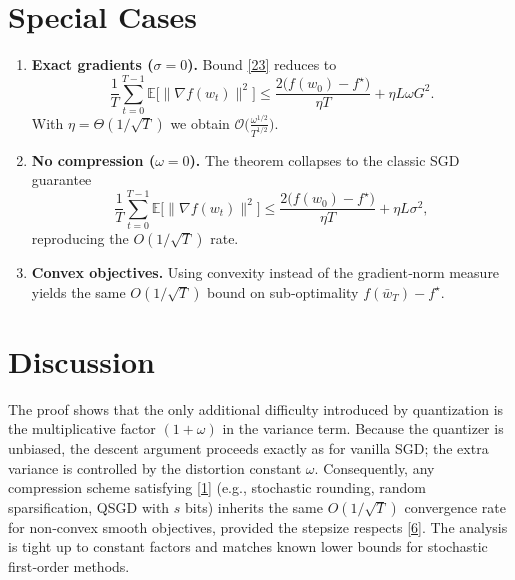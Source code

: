 \documentclass{article}
\begin{document}
\section*{Special Cases}
\begin{enumerate}[label=\arabic*)]
\item \textbf{Exact gradients ($\sigma=0$).}  
   Bound \eqref{23} reduces to
   \[
   \frac{1}{T}\sum_{t=0}^{T-1}\mathbb{E}\big[\|\nabla f(w_{t})\|^{2}\big]
   \le
   \frac{2\big(f(w_{0})-f^{\star}\big)}{\eta T}
   +\eta L\omega G^{2}.
   \]
   With $\eta=\Theta(1/\sqrt{T})$ we obtain $\mathcal{O}\big(\frac{\omega^{1/2}}{T^{1/2}}\big)$.

\item \textbf{No compression ($\omega=0$).}  
   The theorem collapses to the classic SGD guarantee
   \[
   \frac{1}{T}\sum_{t=0}^{T-1}\mathbb{E}\big[\|\nabla f(w_{t})\|^{2}\big]
   \le
   \frac{2\big(f(w_{0})-f^{\star}\big)}{\eta T}
   +\eta L\sigma^{2},
   \]
   reproducing the $O(1/\sqrt{T})$ rate.

\item \textbf{Convex objectives.}  
   Using convexity instead of the gradient‑norm measure yields the same $O(1/\sqrt{T})$ bound on sub‑optimality $f(\bar w_{T})-f^{\star}$.

\end{enumerate}

\section*{Discussion}
The proof shows that the only additional difficulty introduced by quantization is the multiplicative factor $(1+\omega)$ in the variance term. Because the quantizer is unbiased, the descent argument proceeds exactly as for vanilla SGD; the extra variance is controlled by the distortion constant $\omega$. Consequently, any compression scheme satisfying \eqref{1} (e.g., stochastic rounding, random sparsification, QSGD with $s$ bits) inherits the same $O(1/\sqrt{T})$ convergence rate for non‑convex smooth objectives, provided the stepsize respects \eqref{6}. The analysis is tight up to constant factors and matches known lower bounds for stochastic first‑order methods.
\end{document}
